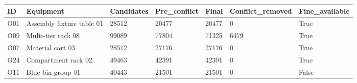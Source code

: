 \begin{tabular}{lllllll}
\hline
ID & Equipment & Candidates & Pre\_conflict & Final & Conflict\_removed & Fine\_available \\
\hline
O01 & Assembly fixture table 01 & 28512 & 20477 & 20477 & 0 & True \\
O09 & Multi-tier rack 08 & 99089 & 77804 & 71325 & 6479 & True \\
O07 & Material cart 03 & 28512 & 27176 & 27176 & 0 & True \\
O24 & Compartment rack 02 & 49463 & 42391 & 42391 & 0 & True \\
O11 & Blue bin group 01 & 40443 & 21501 & 21501 & 0 & False \\
\hline
\end{tabular}

